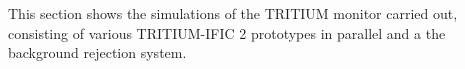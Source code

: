 This section shows the simulations of the TRITIUM monitor carried out, consisting of various TRITIUM-IFIC 2 prototypes in parallel and a the background rejection system.